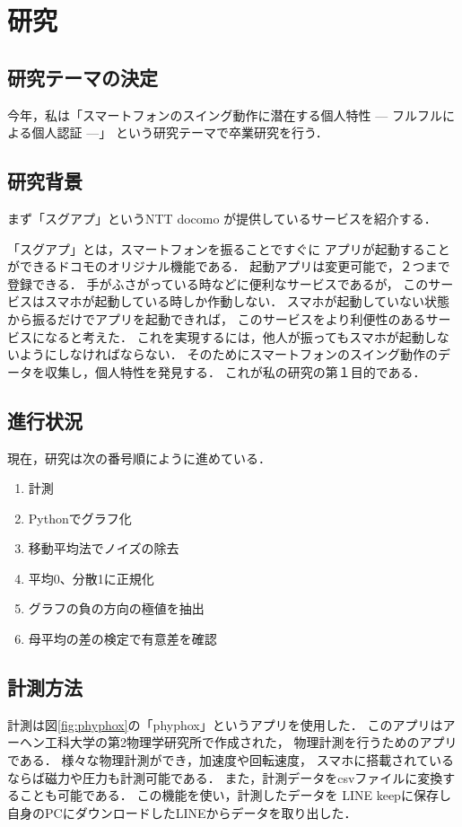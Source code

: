 \section{研究}
\subsection{研究テーマの決定}

今年，私は「スマートフォンのスイング動作に潜在する個人特性 --- フルフルによる個人認証 ---」
という研究テーマで卒業研究を行う．

\subsection{研究背景}
まず「スグアプ」というNTT docomo が提供しているサービスを紹介する．

「スグアプ」とは，スマートフォンを振ることですぐに
アプリが起動することができるドコモのオリジナル機能である．
起動アプリは変更可能で，２つまで登録できる．
手がふさがっている時などに便利なサービスであるが，
このサービスはスマホが起動している時しか作動しない．
スマホが起動していない状態から振るだけでアプリを起動できれば，
このサービスをより利便性のあるサービスになると考えた．
これを実現するには，他人が振ってもスマホが起動しないようにしなければならない．
そのためにスマートフォンのスイング動作のデータを収集し，個人特性を発見する．
これが私の研究の第１目的である．

\subsection{進行状況}
現在，研究は次の番号順にように進めている．
\begin{enumerate}
    \item 計測
    \item Pythonでグラフ化
    \item 移動平均法でノイズの除去
    \item 平均0、分散1に正規化
    \item グラフの負の方向の極値を抽出
    \item 母平均の差の検定で有意差を確認
\end{enumerate}

\subsection{計測方法}
計測は図\ref{fig:phyphox}の「phyphox」というアプリを使用した．
このアプリはアーヘン工科大学の第2物理学研究所で作成された，
物理計測を行うためのアプリである．
様々な物理計測ができ，加速度や回転速度，
スマホに搭載されているならば磁力や圧力も計測可能である．
また，計測データをcsvファイルに変換することも可能である．
この機能を使い，計測したデータを
LINE keepに保存し自身のPCにダウンロードしたLINEからデータを取り出した．

